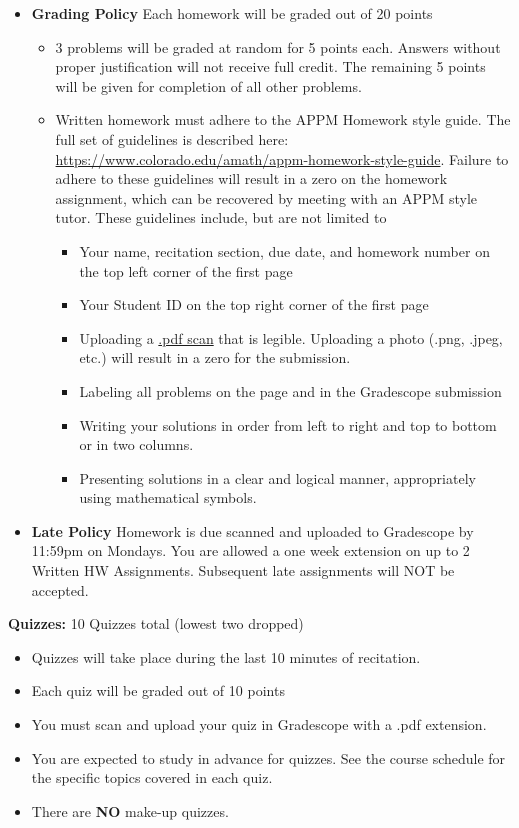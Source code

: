 \documentclass[10pt]{report}
\begin{document}
\begin{itemize}[topsep = 0pt]
	\item \textbf{Grading Policy} Each homework will be graded out of 20 points
	\begin{itemize}[topsep = 0pt]
		\item 3 problems will be graded at random for 5 points each. Answers without proper justification will not receive full credit. The remaining 5 points will be given for completion of all other problems.
		\item Written homework must adhere to the APPM Homework style guide. The full set of guidelines is described here: \url{https://www.colorado.edu/amath/appm-homework-style-guide}. Failure to adhere to these guidelines will result in a zero on the homework assignment, which can be recovered by meeting with an APPM style tutor. These guidelines include, but are not limited to
		\begin{itemize}[topsep = 0pt]
		\item Your name, recitation section, due date, and homework number on the top left corner of the first page
		\item Your Student ID on the top right corner of the first page
		\item Uploading a \underline{.pdf scan} that is legible. Uploading a photo (.png, .jpeg, etc.) will result in a zero for the submission.
		\item Labeling all problems on the page and in the Gradescope submission
		\item Writing your solutions in order from left to right and top to bottom or in two columns.
		\item Presenting solutions in a clear and logical manner, appropriately using mathematical symbols.
		\end{itemize}
		
	\end{itemize}
	\item \textbf{Late Policy} Homework is due scanned and uploaded to Gradescope by 11:59pm on Mondays. You are allowed a one week extension on up to 2 Written HW Assignments. Subsequent late assignments will NOT be accepted.
\end{itemize}

\textbf{Quizzes:} 10 Quizzes total (lowest two dropped)

\begin{itemize}[topsep = 0pt]
	\item  Quizzes will take place during the last 10 minutes of recitation.  
	\item  Each quiz will be graded out of 10 points
	\item  You must scan and upload your quiz in Gradescope with a .pdf extension.  
	\item  You are expected to study in advance for quizzes. See the course schedule for the specific topics covered in each quiz.
	\item There are \textbf{NO} make-up quizzes.
\end{itemize}
\end{document}
